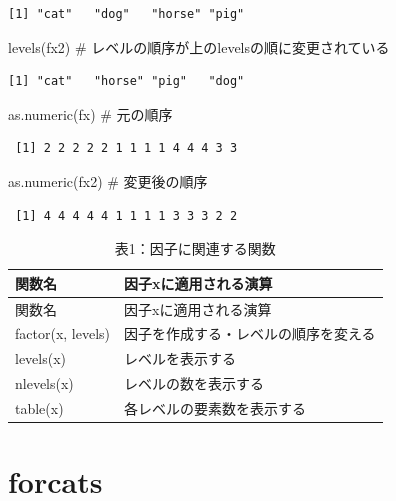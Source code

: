 \documentclass[
  letterpaper,
  DIV=11,
  numbers=noendperiod]{scrreprt}
\newenvironment{Shaded}{\begin{snugshade}}{\end{snugshade}}
\newcommand{\CommentTok}[1]{\textcolor[rgb]{0.37,0.37,0.37}{#1}}
\newcommand{\FunctionTok}[1]{\textcolor[rgb]{0.28,0.35,0.67}{#1}}
\newcommand{\NormalTok}[1]{\textcolor[rgb]{0.00,0.23,0.31}{#1}}
\begin{document}
\begin{verbatim}
[1] "cat"   "dog"   "horse" "pig"  
\end{verbatim}

\begin{Shaded}
\begin{Highlighting}[]
\FunctionTok{levels}\NormalTok{(fx2) }\CommentTok{\# レベルの順序が上のlevelsの順に変更されている}
\end{Highlighting}
\end{Shaded}

\begin{verbatim}
[1] "cat"   "horse" "pig"   "dog"  
\end{verbatim}

\begin{Shaded}
\begin{Highlighting}[]
\FunctionTok{as.numeric}\NormalTok{(fx) }\CommentTok{\# 元の順序}
\end{Highlighting}
\end{Shaded}

\begin{verbatim}
 [1] 2 2 2 2 2 1 1 1 1 4 4 4 3 3
\end{verbatim}

\begin{Shaded}
\begin{Highlighting}[]
\FunctionTok{as.numeric}\NormalTok{(fx2) }\CommentTok{\# 変更後の順序}
\end{Highlighting}
\end{Shaded}

\begin{verbatim}
 [1] 4 4 4 4 4 1 1 1 1 3 3 3 2 2
\end{verbatim}

\begin{longtable}[]{@{}ll@{}}
\caption{表1：因子に関連する関数}\tabularnewline
\toprule()
関数名 & 因子xに適用される演算 \\
\midrule()
\endfirsthead
\toprule()
関数名 & 因子xに適用される演算 \\
\midrule()
\endhead
factor(x, levels) & 因子を作成する・レベルの順序を変える \\
levels(x) & レベルを表示する \\
nlevels(x) & レベルの数を表示する \\
table(x) & 各レベルの要素数を表示する \\
\bottomrule()
\end{longtable}

\hypertarget{forcats}{%
\section{forcats}\label{forcats}}
\end{document}
